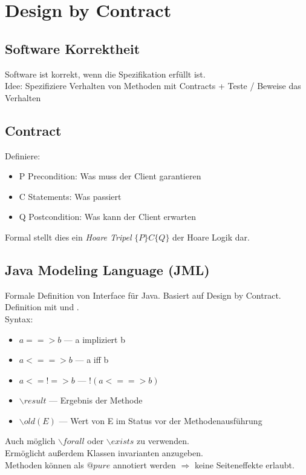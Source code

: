 

\section{Design by Contract}%
\label{dbc:sec:design-by-contract}
\subsection{Software Korrektheit}%
\label{dbc:sub:software-korrektheit}
Software ist korrekt, wenn die Spezifikation erfüllt ist.\\
Idee: Spezifiziere Verhalten von Methoden mit Contracts + Teste / Beweise das Verhalten

\subsection{Contract}%
\label{dbc:sub:contract}
Definiere:
\begin{itemize}
  \item P Precondition: Was muss der Client garantieren
  \item C Statements: Was passiert
  \item Q Postcondition: Was kann der Client erwarten
\end{itemize}
Formal stellt dies ein \textit{Hoare Tripel} \(\{P\} C \{Q\}\) der Hoare Logik dar.

\subsection{Java Modeling Language (JML)}%
\label{dbc:sub:jml}
Formale Definition von Interface für Java. Basiert auf Design by Contract. Definition mit  und
.\\
Syntax:
\begin{itemize}
  \item \(a ==> b\) --- a impliziert b
  \item \(a <==> b\) --- a iff b
  \item \(a <=!=> b\) --- \(!(a<==>b)\)
  \item \(\backslash result\) --- Ergebnis der Methode
  \item \(\backslash old(E)\) --- Wert von E im Status vor der Methodenausführung
\end{itemize}
Auch möglich \(\backslash forall\) oder \(\backslash exists\) zu verwenden.\\
Ermöglicht außerdem Klassen invarianten anzugeben.\\
Methoden können als \(@pure\) annotiert werden \(\Rightarrow\) keine Seiteneffekte erlaubt.

